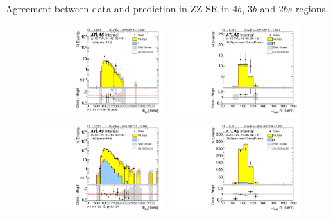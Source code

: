 \begin{table}[htbp!]
\begin{center}

\end{center}
\caption{Agreement between data and prediction in ZZ SR in $4b$, $3b$ and $2bs$ regions.}
\label{CRSB:DataPred_ZZSR}
\end{table}

\begin{figure}[htbp!]
\begin{center}
\includegraphics[width=0.45\textwidth,angle=-90]{figures/boosted/ZZ/Moriond_ZZ_FourTag_Signal_mHH_l_1.pdf}
\includegraphics[width=0.45\textwidth,angle=-90]{figures/boosted/ZZ/Moriond_ZZ_FourTag_Signal_leadHCand_Mass_s.pdf}\\
\includegraphics[width=0.45\textwidth,angle=-90]{figures/boosted/ZZ/Moriond_ZZ_ThreeTag_Signal_mHH_l_1.pdf}
\includegraphics[width=0.45\textwidth,angle=-90]{figures/boosted/ZZ/Moriond_ZZ_ThreeTag_Signal_leadHCand_Mass_s.pdf}\\

\end{center}
\end{figure}
